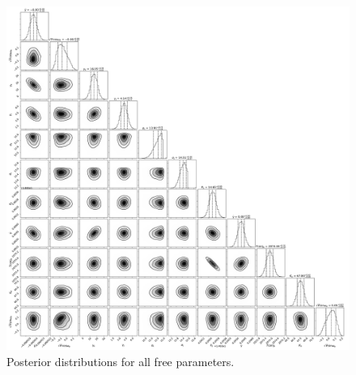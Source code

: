 \documentclass{emulateapj}
\begin{document}
\begin{figure}[!h]
\centering
\includegraphics[width=6.5in]{HD75732_1planet_corner.pdf}
\caption{Posterior distributions for all free parameters.}
\end{figure}

\end{document}
